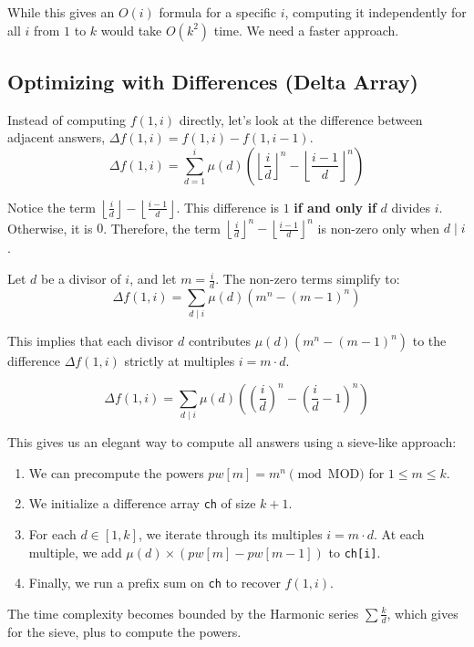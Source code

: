 \documentclass[11pt]{article}
\newcommand{\complexity}[1]{%
  \tcbox[on line, 
    colback=complbg, 
    colframe=compltext!50, 
    boxrule=0.5pt, 
    arc=2pt, 
    boxsep=0pt, 
    left=3pt, right=3pt, top=2pt, bottom=2pt
  ]{\color{compltext}\small\ensuremath{#1}}%
}
\begin{document}
While this gives an $O(i)$ formula for a specific $i$, computing it independently for all $i$ from $1$ to $k$ would take $O(k^2)$ time. We need a faster approach.

\subsection{Optimizing with Differences (Delta Array)}

\begin{derivation}
    Instead of computing $f(1, i)$ directly, let's look at the difference between adjacent answers, $\Delta f(1, i) = f(1, i) - f(1, i-1)$.
    \[ \Delta f(1, i) = \sum_{d=1}^i \mu(d) \left( \left\lfloor \frac{i}{d} \right\rfloor^n - \left\lfloor \frac{i-1}{d} \right\rfloor^n \right) \]

    Notice the term $\left\lfloor \frac{i}{d} \right\rfloor - \left\lfloor \frac{i-1}{d} \right\rfloor$. This difference is $1$ \textbf{if and only if} $d$ divides $i$. Otherwise, it is $0$.
    Therefore, the term $\left\lfloor \frac{i}{d} \right\rfloor^n - \left\lfloor \frac{i-1}{d} \right\rfloor^n$ is non-zero only when $d \mid i$.

    Let $d$ be a divisor of $i$, and let $m = \frac{i}{d}$. The non-zero terms simplify to:
    \[ \Delta f(1, i) = \sum_{d \mid i} \mu(d) \left( m^n - (m-1)^n \right) \]

    This implies that each divisor $d$ contributes $\mu(d) \left( m^n - (m-1)^n \right)$ to the difference $\Delta f(1, i)$ strictly at multiples $i = m \cdot d$.
\end{derivation}

\begin{resultbox}
    \begin{equation}
        \Delta f(1, i) = \sum_{d \mid i} \mu(d) \left( \left(\frac{i}{d}\right)^n - \left(\frac{i}{d}-1\right)^n \right)
    \end{equation}
\end{resultbox}

This gives us an elegant way to compute all answers using a sieve-like approach:
\begin{enumerate}
    \item We can precompute the powers $pw[m] = m^n \pmod{\text{MOD}}$ for $1 \le m \le k$.
    \item We initialize a difference array \texttt{ch} of size $k+1$.
    \item For each $d \in [1, k]$, we iterate through its multiples $i = m \cdot d$. At each multiple, we add $\mu(d) \times (pw[m] - pw[m-1])$ to \texttt{ch[i]}.
    \item Finally, we run a prefix sum on \texttt{ch} to recover $f(1, i)$.
\end{enumerate}
The time complexity becomes bounded by the Harmonic series $\sum \frac{k}{d}$, which gives \complexity{O(k \log k)} for the sieve, plus \complexity{O(k \log n)} to compute the powers.
\end{document}

